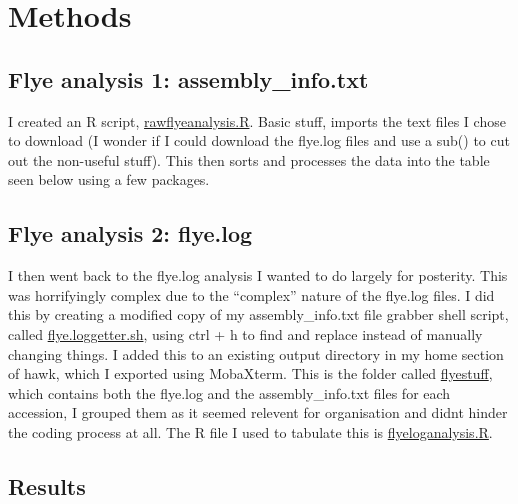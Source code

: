 \documentclass[
  letterpaper,
  DIV=11,
  numbers=noendperiod]{scrreprt}
\begin{document}
\section{Methods}\label{methods-11}

\subsection{Flye analysis 1:
assembly\_info.txt}\label{flye-analysis-1-assembly_info.txt}

I created an R script,
\href{https://github.com/tobiasnunn/tnunn_research/blob/aad7006d65994e391c8621132fd7fab3fbf53609/00_scripts/rawflyeanalysis.R}{rawflyeanalysis.R}.
Basic stuff, imports the text files I chose to download (I wonder if I
could download the flye.log files and use a sub() to cut out the
non-useful stuff). This then sorts and processes the data into the table
seen below using a few packages.

\subsection{Flye analysis 2: flye.log}\label{flye-analysis-2-flye.log}

I then went back to the flye.log analysis I wanted to do largely for
posterity. This was horrifyingly complex due to the ``complex'' nature
of the flye.log files. I did this by creating a modified copy of my
assembly\_info.txt file grabber shell script, called
\href{https://github.com/tobiasnunn/tnunn_research/blob/main/Research_Experience_Module/00_scripts/Slurmscripts/flye.loggetter.sh}{flye.loggetter.sh},
using ctrl + h to find and replace instead of manually changing things.
I added this to an existing output directory in my home section of hawk,
which I exported using MobaXterm. This is the folder called
\href{https://github.com/tobiasnunn/tnunn_research/tree/main/Research_Experience_Module/02_middle-analysis_outputs/flyestuff}{flyestuff},
which contains both the flye.log and the assembly\_info.txt files for
each accession, I grouped them as it seemed relevent for organisation
and didnt hinder the coding process at all. The R file I used to
tabulate this is
\href{https://github.com/tobiasnunn/tnunn_research/blob/main/Research_Experience_Module/00_scripts/Rscripts/flyeloganalysis.R}{flyeloganalysis.R}.

\subsection{Results}\label{results-11}
\end{document}
